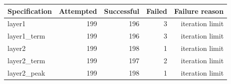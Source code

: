 \begingroup\small\setlength{\tabcolsep}{3pt}
\begin{tabularx}{\linewidth}{Xrrrr}\toprule
Specification & Attempted & Successful & Failed & Failure reason \\ \midrule
layer1 & 199 & 196 & 3 & iteration limit \\
layer1\_term & 199 & 196 & 3 & iteration limit \\
layer2 & 199 & 198 & 1 & iteration limit \\
layer2\_term & 199 & 197 & 2 & iteration limit \\
layer2\_peak & 199 & 198 & 1 & iteration limit \\
\bottomrule\end{tabularx}\endgroup
